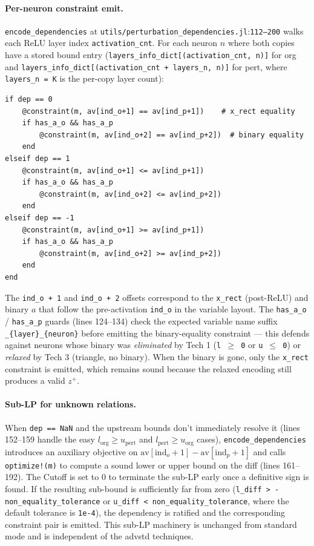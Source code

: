 \documentclass[11pt]{article}
\newcommand{\src}[1]{\texttt{\small #1}}
\newcommand{\fileline}[2]{\src{#1}:\src{#2}}
\begin{document}
\paragraph{Per-neuron constraint emit.}
\src{encode\_dependencies} at \fileline{utils/perturbation\_dependencies.jl}{112--200}
walks each ReLU layer index \src{activation\_cnt}. For each neuron
$n$ where both copies have a stored bound entry
(\src{layers\_info\_dict[(activation\_cnt, n)]} for org and
\src{layers\_info\_dict[(activation\_cnt + layers\_n, n)]} for pert,
where \src{layers\_n = K} is the per-copy layer count):

\begin{lstlisting}[style=jl]
if dep == 0
    @constraint(m, av[ind_o+1] == av[ind_p+1])    # x_rect equality
    if has_a_o && has_a_p
        @constraint(m, av[ind_o+2] == av[ind_p+2])  # binary equality
    end
elseif dep == 1
    @constraint(m, av[ind_o+1] <= av[ind_p+1])
    if has_a_o && has_a_p
        @constraint(m, av[ind_o+2] <= av[ind_p+2])
    end
elseif dep == -1
    @constraint(m, av[ind_o+1] >= av[ind_p+1])
    if has_a_o && has_a_p
        @constraint(m, av[ind_o+2] >= av[ind_p+2])
    end
end
\end{lstlisting}

The \src{ind\_o + 1} and \src{ind\_o + 2} offsets correspond to the
\src{x\_rect} (post-ReLU) and binary $a$ that follow the
pre-activation \src{ind\_o} in the variable layout. The
\src{has\_a\_o} / \src{has\_a\_p} guards (lines 124--134) check the
expected variable name suffix \src{\_\{layer\}\_\{neuron\}} before
emitting the binary-equality constraint --- this defends against
neurons whose binary was \emph{eliminated} by Tech 1
(\src{l \(\ge\) 0} or \src{u \(\le\) 0}) or \emph{relaxed} by Tech 3
(triangle, no binary). When the binary is gone, only the
\src{x\_rect} constraint is emitted, which remains sound because the
relaxed encoding still produces a valid $z^+$.

\paragraph{Sub-LP for unknown relations.}
When \src{dep == NaN} and the upstream bounds don't immediately resolve
it (lines 152--159 handle the easy
$l_\mathrm{org} \ge u_\mathrm{pert}$ and
$l_\mathrm{pert} \ge u_\mathrm{org}$ cases), \src{encode\_dependencies}
introduces an auxiliary objective on
$\mathrm{av}[\mathrm{ind}_o + 1] - \mathrm{av}[\mathrm{ind}_p + 1]$
and calls \src{optimize!(m)} to compute a sound lower or upper bound
on the diff (lines 161--192). The Cutoff is set to 0 to terminate the
sub-LP early once a definitive sign is found. If the resulting
sub-bound is sufficiently far from zero
(\src{l\_diff > -non\_equality\_tolerance} or
\src{u\_diff < non\_equality\_tolerance}, where the default tolerance
is \texttt{1e-4}), the dependency is ratified and the corresponding
constraint pair is emitted. This sub-LP machinery is unchanged from
standard mode and is independent of the advstd techniques.
\end{document}
